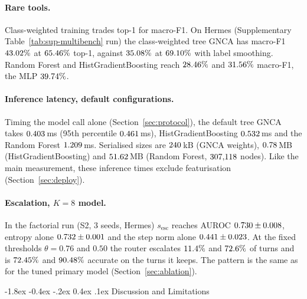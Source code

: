\documentclass[10pt,twocolumn,letterpaper]{article}
\makeatletter
\renewcommand\section{\@startsection {section}{1}{\z@}%
  {-1.8ex \@plus -0.4ex \@minus -.2ex}%
  {0.4ex \@plus.1ex}%
  {\normalfont\normalsize\bfseries}}
\makeatother
\begin{document}
\paragraph{Rare tools.} Class-weighted training trades top-1 for macro-F1. On Hermes (Supplementary Table~\ref{tab:sup-multibench} run) the class-weighted tree GNCA has macro-F1 $43.02\%$ at $65.46\%$ top-1, against $35.08\%$ at $69.10\%$ with label smoothing. Random Forest and HistGradientBoosting reach $28.46\%$ and $31.56\%$ macro-F1, the MLP $39.74\%$.
\paragraph{Inference latency, default configurations.} Timing the model call alone (Section~\ref{sec:protocol}), the default tree GNCA takes $0.403$\,ms (95th percentile $0.461$\,ms), HistGradientBoosting $0.532$\,ms and the Random Forest $1.209$\,ms. Serialised sizes are $240$\,kB (GNCA weights), $0.78$\,MB (HistGradientBoosting) and $51.62$\,MB (Random Forest, $307{,}118$ nodes). Like the main measurement, these inference times exclude featurisation (Section~\ref{sec:deploy}).
\paragraph{Escalation, $K{=}8$ model.} In the factorial run (S2, 3 seeds, Hermes) $s_{\text{esc}}$ reaches AUROC $0.730 \pm 0.008$, entropy alone $0.732 \pm 0.001$ and the step norm alone $0.441 \pm 0.023$. At the fixed thresholds $\theta{=}0.76$ and $0.50$ the router escalates $11.4\%$ and $72.6\%$ of turns and is $72.45\%$ and $90.48\%$ accurate on the turns it keeps. The pattern is the same as for the tuned primary model (Section~\ref{sec:ablation}).

\section{Discussion and Limitations}\label{sec:discussion}
\end{document}
